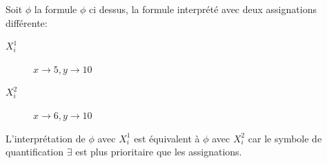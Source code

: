 Soit $\phi$ la formule $\phi$ ci dessus, la formule interprété avec deux assignations différente:
\begin{description}
\item[$X_i^1$] $x \rightarrow 5, y \rightarrow 10$
\item[$X_i^2$] $x \rightarrow 6, y \rightarrow 10$
\end{description}

L'interprétation de $\phi$ avec $X_i^1$ est équivalent à $\phi$ avec $X_i^2$ car le symbole de quantification $\exists$ est plus prioritaire que les assignations.\\



\pagebreak
